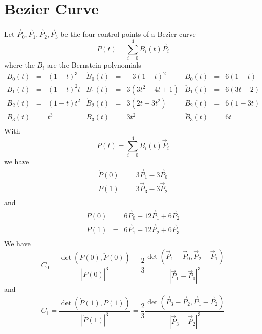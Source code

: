 \documentclass[11pt]{amsart}
\begin{document}
\section{Bezier Curve}
Let $\vec{P}_0,\vec{P}_1,\vec{P}_2,\vec{P}_3$
be the four control points of a Bezier curve
\[
	P(t) = \sum_{i=0}^4 B_i(t) \vec{P}_i
\]
where the $B_i$ are the Bernstein polynomials
\[
	\begin{array}{rcl|rcl|rcl}
	B_0(t) & = & (1-t)^3  & \dot{B}_0(t) & = & -3(1-t)^2     & \ddot{B}_0(t) & = & 6(1-t)\\
 	B_1(t) & = & (1-t)^2t & \dot{B}_1(t) & = &  3(3t^2-4t+1) & \ddot{B}_1(t) & = & 6(3t-2)\\
	B_2(t) & = & (1-t)t^2 & \dot{B}_2(t) & = &  3(2t-3t^2)   & \ddot{B}_2(t) & = & 6(1-3t)\\
	B_3(t) & = & t^3      & \dot{B}_3(t) & = &  3t^2         & \ddot{B}_3(t) & = & 6t    \\
	\end{array} 
\]
With
\[
	\dot{P}(t) = \sum_{i=0}^4 B_i(t) \vec{P}_i
\]
we have
\[
\begin{array}{rcl}
	\dot{P}(0) & = & 3\vec{P}_1 - 3\vec{P}_0 \\
	\dot{P}(1) & = & 3\vec{P}_3 - 3\vec{P}_2 \\
\end{array}
\]
and
\[
	\begin{array}{rcl}
	\ddot{P}(0) & = & 6\vec{P}_0 - 12 \vec{P}_1 + 6\vec{P}_2\\
	\ddot{P}(1) & = & 6\vec{P}_1 - 12 \vec{P}_2 + 6\vec{P}_3\\
	\end{array}
\]
We have
\[
	C_0 = \dfrac{\det(\dot{P}(0),\ddot{P}(0))}{\left|\dot{P}(0)\right|^3} 
	= \dfrac{2}{3} \dfrac{\det(\vec{P}_1 - \vec{P}_0,\vec{P}_2 - \vec{P}_1)}{\left|\vec{P}_1 - \vec{P}_0\right|^3}
\]
and
\[
	C_1 = \dfrac{\det(\dot{P}(1),\ddot{P}(1))}{\left|\dot{P}(1)\right|^3} 
	= \dfrac{2}{3} \dfrac{\det(\vec{P}_3 - \vec{P}_2,\vec{P}_1 - \vec{P}_2)}{\left|\vec{P}_3 - \vec{P}_2\right|^3}
\]
\end{document}
